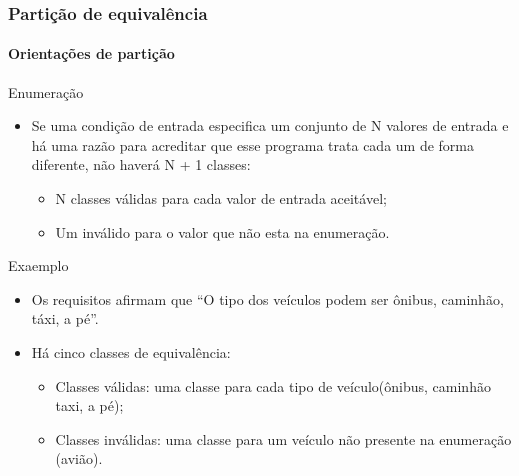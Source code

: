 \begin{frame}
\frametitle{Partição de equivalência}
\framesubtitle{Orientações de partição}

\begin{block:fact}{Enumeração}
\begin{itemize}
	\item Se uma condição de entrada especifica um conjunto de N valores de entrada e há
	uma razão para acreditar que esse programa trata cada um de forma diferente, não
	haverá N + 1 classes:
	\begin{itemize}
		\item N classes válidas para cada valor de entrada aceitável;
		\item Um inválido para o valor que não esta na enumeração.
	\end{itemize}
\end{itemize}
\end{block:fact}

\begin{block}{Exaemplo}
\begin{itemize}
	\item Os requisitos afirmam que ``O tipo dos veículos podem ser ônibus, 
	caminhão, táxi, a pé''.

	\item Há cinco classes de equivalência:
	\begin{itemize}
		\item Classes válidas: uma classe para cada tipo de veículo(ônibus, caminhão
		taxi, a pé);
		\item Classes inválidas: uma classe para um veículo não presente na
		enumeração (avião).
	\end{itemize}
\end{itemize}
\end{block}
\end{frame}



